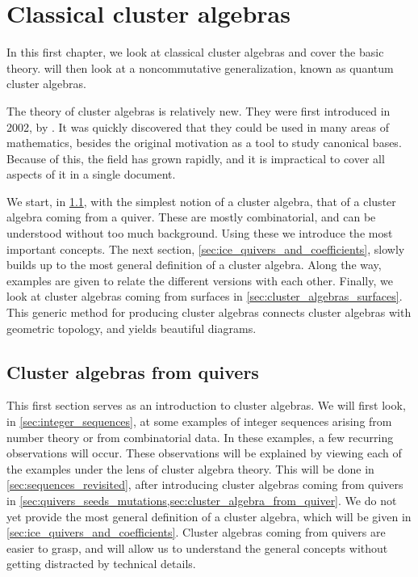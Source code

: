 \chapter{Classical cluster algebras}
\chaptertoc

\noindent
In this first chapter, we look at classical cluster algebras and cover the basic theory.  will then look at a noncommutative generalization, known as quantum cluster algebras.

The theory of cluster algebras is relatively new. They were first introduced in 2002,
by \textcite{FominZelevinsky2002CAF}. It was quickly discovered that they could be used
in many areas of mathematics, besides the original motivation as a tool to study
canonical bases. Because of this, the field has grown rapidly, and it is impractical to
cover all aspects of it in a single document.

We start, in \cref{sec:cluster_algebras_quivers}, with the simplest notion of a cluster
algebra, that of a cluster algebra coming from a quiver. These are mostly
combinatorial, and can be understood without too much background. Using these we
introduce the most important concepts. The next section,
\cref{sec:ice_quivers_and_coefficients}, slowly builds up to the most general
definition of a cluster algebra. Along the way, examples are given to relate the
different versions with each other. Finally, we look at cluster algebras coming from
surfaces in \cref{sec:cluster_algebras_surfaces}. This generic method for producing
cluster algebras connects cluster algebras with geometric topology, and yields
beautiful diagrams.

\section{Cluster algebras from quivers}\label{sec:cluster_algebras_quivers}

This first section serves as an introduction to cluster algebras. We will first look,
in \cref{sec:integer_sequences}, at some examples of integer sequences arising from
number theory or from combinatorial data. In these examples, a few recurring
observations will occur. These observations will be explained by viewing each of the
examples under the lens of cluster algebra theory. This will be done in
\cref{sec:sequences_revisited}, after introducing cluster algebras coming from quivers
in \cref{sec:quivers_seeds_mutations,sec:cluster_algebra_from_quiver}. We do not yet
provide the most general definition of a cluster algebra, which will be given in
\cref{sec:ice_quivers_and_coefficients}. Cluster algebras coming from quivers are
easier to grasp, and will allow us to understand the general concepts without getting
distracted by technical details.

